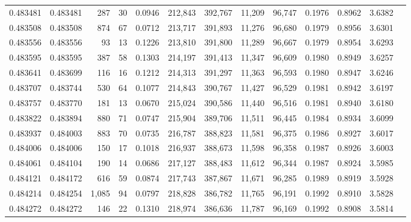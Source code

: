\begin{tabular}{rrrrrrrrrrrrr}
0.483481 & 0.483481 &   287 &    30 &                                     0.0946 & 212,843 & 392,767 &  11,209 &  96,747 & 0.1976 & 0.8962 & 3.6382 \\
0.483508 & 0.483508 &   874 &    67 &                                     0.0712 & 213,717 & 391,893 &  11,276 &  96,680 & 0.1979 & 0.8956 & 3.6301 \\
0.483556 & 0.483556 &    93 &    13 &                                     0.1226 & 213,810 & 391,800 &  11,289 &  96,667 & 0.1979 & 0.8954 & 3.6293 \\
0.483595 & 0.483595 &   387 &    58 &                                     0.1303 & 214,197 & 391,413 &  11,347 &  96,609 & 0.1980 & 0.8949 & 3.6257 \\
0.483641 & 0.483699 &   116 &    16 &                                     0.1212 & 214,313 & 391,297 &  11,363 &  96,593 & 0.1980 & 0.8947 & 3.6246 \\
0.483707 & 0.483744 &   530 &    64 &                                     0.1077 & 214,843 & 390,767 &  11,427 &  96,529 & 0.1981 & 0.8942 & 3.6197 \\
0.483757 & 0.483770 &   181 &    13 &                                     0.0670 & 215,024 & 390,586 &  11,440 &  96,516 & 0.1981 & 0.8940 & 3.6180 \\
0.483822 & 0.483894 &   880 &    71 &                                     0.0747 & 215,904 & 389,706 &  11,511 &  96,445 & 0.1984 & 0.8934 & 3.6099 \\
0.483937 & 0.484003 &   883 &    70 &                                     0.0735 & 216,787 & 388,823 &  11,581 &  96,375 & 0.1986 & 0.8927 & 3.6017 \\
0.484006 & 0.484006 &   150 &    17 &                                     0.1018 & 216,937 & 388,673 &  11,598 &  96,358 & 0.1987 & 0.8926 & 3.6003 \\
0.484061 & 0.484104 &   190 &    14 &                                     0.0686 & 217,127 & 388,483 &  11,612 &  96,344 & 0.1987 & 0.8924 & 3.5985 \\
0.484121 & 0.484172 &   616 &    59 &                                     0.0874 & 217,743 & 387,867 &  11,671 &  96,285 & 0.1989 & 0.8919 & 3.5928 \\
0.484214 & 0.484254 & 1,085 &    94 &                                     0.0797 & 218,828 & 386,782 &  11,765 &  96,191 & 0.1992 & 0.8910 & 3.5828 \\
0.484272 & 0.484272 &   146 &    22 &                                     0.1310 & 218,974 & 386,636 &  11,787 &  96,169 & 0.1992 & 0.8908 & 3.5814 \\

\end{tabular}
